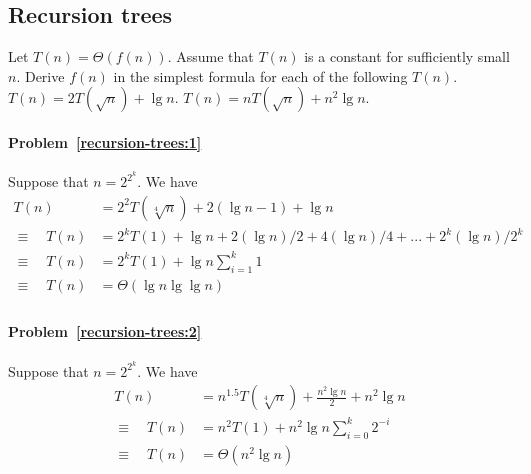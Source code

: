 \subsection{Recursion trees}
\begin{Exercise}
Let $T(n) = \Theta(f(n))$. Assume that $T(n)$ is a constant for sufficiently small $n$. Derive $f(n)$ in the simplest formula for each of the following $T(n)$.
\Question $T(n) = 2T(\sqrt{n}) + \lg n$. \label{recursion-trees:1} 
\Question $T(n) = nT(\sqrt{n}) + n^2 \lg n$. \label{recursion-trees:2} 
\end{Exercise}
\begin{Answer}

\paragraph{Problem~\ref{recursion-trees:1}} Suppose that $n = 2^{2^k}$. We have
\begin{align*}
T(n) &= 2^2T(\sqrt[4]{n}) + 2(\lg n - 1) + \lg n \\
\equiv \quad T(n) &= 2^k T(1) + \lg n + 2(\lg n)/2 + 4(\lg n)/4 + ... + 2^k(\lg n)/2^k \\
\equiv \quad T(n) &= 2^k T(1) + \lg n \sum_{i=1}^k 1 \\
\equiv \quad T(n) &= \Theta(\lg n \lg \lg n) \\
\end{align*}

\paragraph{Problem~\ref{recursion-trees:2}} Suppose that $n = 2^{2^k}$. We have
\begin{align*}
T(n) &= n^{1.5}T(\sqrt[4]{n}) + \frac{n^2 \lg n}{2} + n^2 \lg n \\
\equiv \quad T(n) &= n^2 T(1) + n^2 \lg n \sum_{i=0}^k 2^{-i} \\
\equiv \quad T(n) &= \Theta(n^2 \lg n) \\
\end{align*}

\end{Answer}

